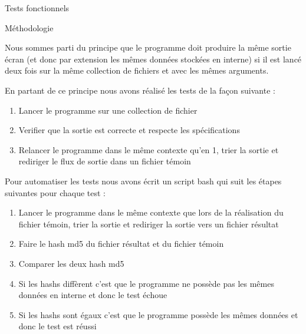 \documentclass{article}
\begin{document}
\begin{section}{Tests fonctionnels}

 \begin{subsection}{Méthodologie}
  
    Nous sommes parti du principe que le programme doit produire la même sortie écran (et donc par extension les mêmes données stockées en interne)
    si il est lancé deux fois sur la même collection de fichiers et avec les mêmes arguments.

    En partant de ce principe nous avons réalisé les tests de la façon suivante : 

    \begin{enumerate}
      \item Lancer le programme sur une collection de fichier
      \item Verifier que la sortie est correcte et respecte les spécifications
      \item Relancer le programme dans le même contexte qu'en 1, trier la sortie et rediriger le flux de sortie dans un fichier témoin
    \end{enumerate}

    Pour automatiser les tests nous avons écrit un script bash qui suit les étapes suivantes pour chaque test :
  
    \begin{enumerate}
      \item Lancer le programme dans le même contexte que lors de la réalisation du fichier témoin, trier la sortie et rediriger la sortie vers un fichier résultat
      \item Faire le hash md5 du fichier résultat et du fichier témoin
      \item Comparer les deux hash md5
      \item Si les hashs diffèrent c'est que le programme ne possède pas les mêmes données en interne et donc le test échoue
      \item Si les hashs sont égaux c'est que le programme possède les mêmes données et donc le test est réussi
    \end{enumerate}

 \end{subsection}





\end{section}
\end{document}
